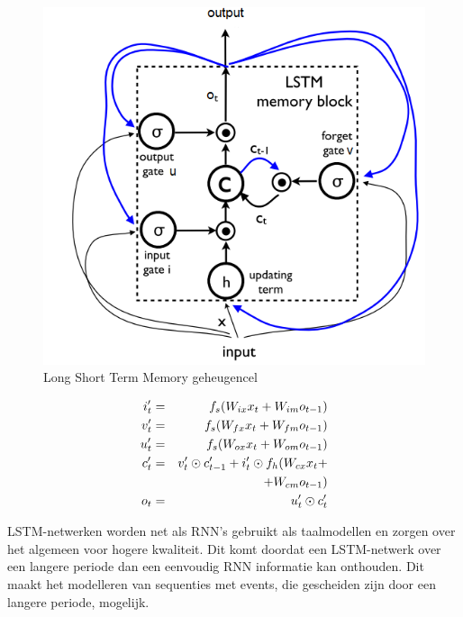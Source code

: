 \begin{figure}[tb]
    \centering
    \includegraphics[width=\linewidth]{Images/lstm.PNG}
    \caption{Long Short Term Memory geheugencel}
    \label{fig:lstm}
\end{figure}

\begin{eqnarray}
\vspace{-3mm}
\label{lstm-memory-start}
i_t' & = & f_s (W_{ix} x_t + W_{im} o_{t-1}) \label{lstm-input} \\
v_t' & = & f_s (W_{fx} x_t + W_{fm} o_{t-1}) \\
u_t' & = & f_s (W_{ox} x_t + W_{om} o_{t-1}) \\
c_t' & = & v_t' \odot c_{t-1}' + i_t' \odot f_h(W_{cx} x_t + \nonumber \\
&   & + W_{cm} o_{t-1}) \\
o_t & = & u_t' \odot c_t'
\label{lstm-memory}
\vspace{-3mm}
\end{eqnarray}

LSTM-netwerken worden net als RNN's gebruikt als taalmodellen en zorgen over het algemeen voor hogere kwaliteit. Dit komt doordat een LSTM-netwerk over een langere periode dan een eenvoudig RNN informatie kan onthouden. Dit maakt het modelleren van sequenties met events, die gescheiden zijn door een langere periode, mogelijk.


